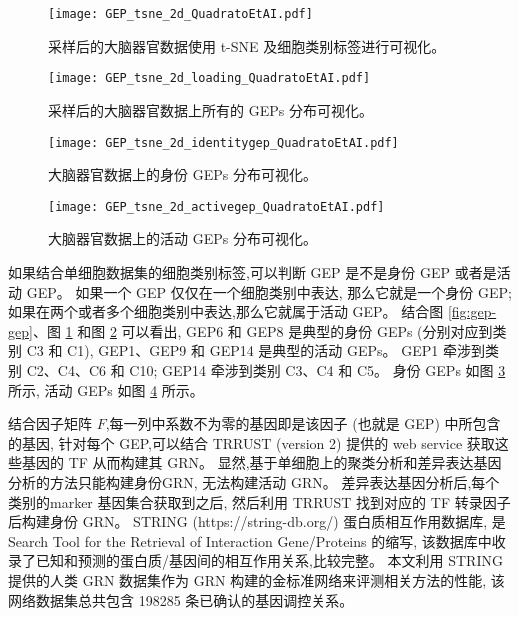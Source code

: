 \begin{figure}[!htbp]
    \centering
    \texttt{[image: GEP\_tsne\_2d\_QuadratoEtAI.pdf]}
    \caption{
    采样后的大脑器官数据使用 t-SNE 及细胞类别标签进行可视化。
    }
    \label{fig:gep-tsne}
\end{figure}

\begin{figure}[!htbp]
    \centering
    \texttt{[image: GEP\_tsne\_2d\_loading\_QuadratoEtAI.pdf]}
    \caption{
    采样后的大脑器官数据上所有的 GEPs 分布可视化。
    }
    \label{fig:gep-distribution}
\end{figure}

\begin{figure}[!htbp]
    \centering
    \texttt{[image: GEP\_tsne\_2d\_identitygep\_QuadratoEtAI.pdf]}
    \caption{
    大脑器官数据上的身份 GEPs 分布可视化。
    }
    \label{fig:gep-identitytsne}
\end{figure}

\begin{figure}[!htbp]
    \centering
    \texttt{[image: GEP\_tsne\_2d\_activegep\_QuadratoEtAI.pdf]}
    \caption{
    大脑器官数据上的活动 GEPs 分布可视化。
    }
    \label{fig:gep-activetsne}
\end{figure}

如果结合单细胞数据集的细胞类别标签,可以判断 GEP 是不是身份 GEP 或者是活动 GEP。
如果一个 GEP 仅仅在一个细胞类别中表达, 那么它就是一个身份 GEP;
如果在两个或者多个细胞类别中表达,那么它就属于活动 GEP。
结合图 \ref{fig:gep-gep}、图 \ref{fig:gep-tsne} 和图 \ref{fig:gep-distribution} 可以看出, 
GEP6 和 GEP8 是典型的身份 GEPs (分别对应到类别 C3 和 C1), GEP1、GEP9 和 GEP14 是典型的活动 GEPs。
GEP1 牵涉到类别 C2、C4、C6 和 C10; GEP14 牵涉到类别 C3、C4 和 C5。
身份 GEPs 如图 \ref{fig:gep-identitytsne} 所示,
活动 GEPs 如图 \ref{fig:gep-activetsne} 所示。


结合因子矩阵 $F$,每一列中系数不为零的基因即是该因子 (也就是 GEP) 中所包含的基因,
针对每个 GEP,可以结合 TRRUST (version 2) 提供的 web service 获取这些基因的 TF 从而构建其 GRN。
显然,基于单细胞上的聚类分析和差异表达基因分析的方法只能构建身份GRN, 无法构建活动 GRN。
差异表达基因分析后,每个类别的marker 基因集合获取到之后, 
然后利用 TRRUST 找到对应的 TF 转录因子后构建身份 GRN。
STRING (https://string-db.org/) 蛋白质相互作用数据库,
是 Search Tool for the Retrieval of Interaction Gene/Proteins 的缩写,
该数据库中收录了已知和预测的蛋白质/基因间的相互作用关系,比较完整。
本文利用 STRING 提供的人类 GRN 数据集作为 GRN 构建的金标准网络来评测相关方法的性能, 
该网络数据集总共包含 198285 条已确认的基因调控关系。

